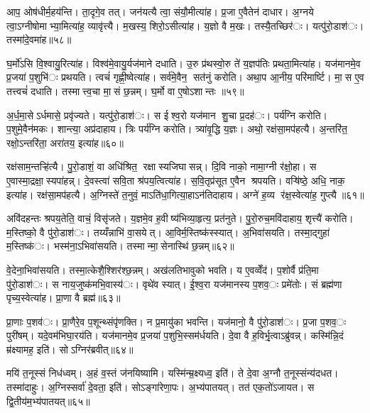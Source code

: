 आप॒ ओष॑धीर्म॒हय॑न्ति। ता॒दृगे॒व तत्। जन॑यत्यै त्वा॒ संयौ॒मीत्या॑ह। प्र॒जा ए॒वैतेन॑ दाधार। अ॒ग्नये त्वा॒ऽग्नीषोमाभ्या॒मित्या॑ह॒ व्यावृ॑त्त्यै। म॒खस्य॒ शिरो॒ऽसीत्या॑ह। य॒ज्ञो वै म॒खः। तस्यै॒तच्छिर॑ः। यत्पु॑रो॒डाश॑ः। तस्मा॑दे॒वमा॑ह॥५८॥

घ॒र्मो॑ऽसि वि॒श्वायु॒रित्या॑ह। विश्व॑मे॒वायु॒र्यज॑माने दधाति। उ॒रु प्र॑थस्वो॒रु ते॑ य॒ज्ञप॑तिः प्रथता॒मित्या॑ह। यज॑मानमे॒व प्र॒जया॑ प॒शुभि॑ः प्रथयति। त्वचं॑ गृह्णी॒ष्वेत्या॑ह। सर्व॑मे॒वैन॒ सत॑नुं करोति। अथा॒प आ॒नीय॒ परि॑मार्ष्टि। मा॒स ए॒व तत्त्वचं॑ दधाति। तस्मात्त्व॒चा मा॒सं छ॒न्नम्। घ॒र्मो वा ए॒षोऽशान्तः ॥५९॥

अ॒र्ध॒मा॒सेऽर्धमासे॒ प्रवृ॑ज्यते। यत्पु॑रो॒डाश॑ः। स ईश्व॒रो यज॑मान शु॒चा प्र॒दह॑ः। पर्य॑ग्नि करोति। प॒शुमे॒वैन॑मकः। शान्त्या॒ अप्र॑दाहाय। त्रिः पर्य॑ग्नि करोति। त्र्या॑वृ॒द्धि य॒ज्ञः। अथो॒ रक्ष॑सा॒मप॑हत्यै। अ॒न्तरि॑त॒ रक्षो॒ऽन्तरि॑ता॒ अरा॑तय॒ इत्या॑ह॥६०॥

रक्ष॑साम॒न्तऱ्हि॑त्यै। पु॒रो॒डाशं॒ वा अधि॑श्रित॒ रक्षास्यजिघासन्न्। दि॒वि नाको॒ नामा॒ग्नी र॑क्षो॒हा। स ए॒वास्मा॒द्रक्षा॒स्यपा॑हन्न्। दे॒वस्त्वा॑ सवि॒ता श्र॑पय॒त्वित्या॑ह। स॒वि॒तृप्र॑सूत ए॒वैन श्रपयति। वऱ्षि॑ष्ठे॒ अधि॒ नाक॒ इत्या॑ह। रक्ष॑सा॒मप॑हत्यै। अ॒ग्निस्ते॑ त॒नुवं॒ माऽति॑धा॒गित्या॒हाऽन॑तिदाहाय। अग्ने॑ ह॒व्य र॑क्ष॒स्वेत्या॑ह॒ गुप्त्यै॥६१॥

अवि॑दहन्तः श्रपय॒तेति॒ वाचं॒ विसृ॑जते। य॒ज्ञमे॒व ह॒वीष्य॑भिव्या॒हृत्य॒ प्रत॑नुते। पु॒रो॒रुच॒मवि॑दाहाय॒ शृत्त्यै॑ करोति। म॒स्तिष्को॒ वै पु॑रो॒डाश॑ः। तय्यँन्नाभि॑ वा॒सयेत्। आ॒विर्म॒स्तिष्क॑स्स्यात्। अ॒भिवा॑सयति। तस्मा॒द्गुहा॑ म॒स्तिष्क॑ः। भस्म॑ना॒ऽभिवा॑सयति। तस्मान्मा॒सेनास्थि॑ छ॒न्नम्॥६२॥

वे॒देना॒भिवा॑सयति। तस्मा॒त्केशै॒श्शिर॑श्छ॒न्नम्। अख॑लतिभावुको भवति। य ए॒वव्वेँद॑। प॒शोर्वै प्र॑ति॒मा पु॑रो॒डाश॑ः। स नाय॒जुष्क॑मभि॒वास्य॑ः। वृथे॑व स्यात्। ई॒श्व॒रा यज॑मानस्य प॒शव॒ः प्रमे॑तोः। सं ब्रह्म॑णा पृच्य॒स्वेत्या॑ह। प्रा॒णा वै ब्रह्म॑॥६३॥

प्रा॒णाः प॒शव॑ः। प्रा॒णैरे॒व प॒शून्थ्संपृ॑णक्ति। न प्र॒मायु॑का भवन्ति। यज॑मानो॒ वै पु॑रो॒डाश॑ः। प्र॒जा प॒शव॒ः पुरी॑षम्। यदे॒वम॑भिघा॒रय॑ति। यज॑मानमे॒व प्र॒जया॑ प॒शुभि॒स्सम॑र्धयति। दे॒वा वै ह॒विर्भृ॒त्वाऽब्रु॑वन्न्। कस्मि॑न्नि॒दं म्र॑क्ष्यामह॒ इति॑। सोऽग्निर॑ब्रवीत्॥६४॥

मयि॑ त॒नूस्सं निध॑ध्वम्। अ॒हं व॒स्तं ज॑नयिष्यामि। यस्मि॑न्म्र॒क्ष्यध्व॒ इति॑। ते दे॒वा अ॒ग्नौ त॒नूस्संन्य॑दधत। तस्मा॑दाहुः। अ॒ग्निस्सर्वा॑ दे॒वता॒ इति॑। सोऽङ्गा॑रेणा॒पः। अ॒भ्य॑पातयत्। तत॑ एक॒तो॑ऽजायत। स द्वि॒तीय॑म॒भ्य॑पातयत्॥६५॥

